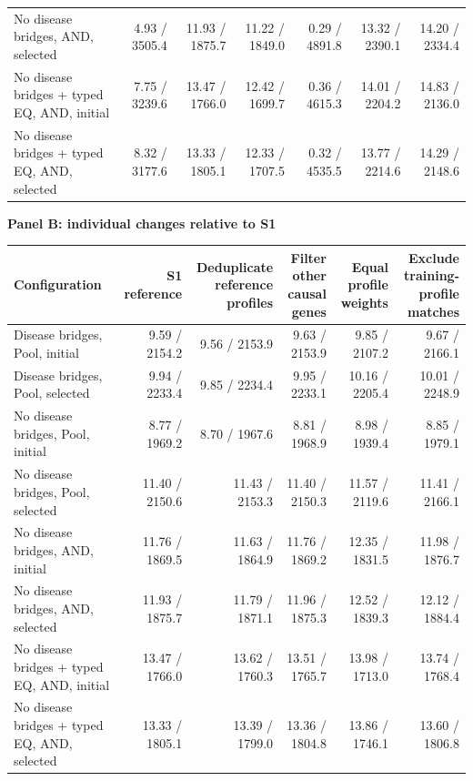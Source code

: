 \begin{landscape}
\begin{table}[p]
\begin{adjustbox}{max width=\linewidth}
\begin{tabular}{lrrrrrr}
No disease bridges, AND, selected & 4.93 / 3505.4 & 11.93 / 1875.7 & 11.22 / 1849.0 & 0.29 / 4891.8 & 13.32 / 2390.1 & 14.20 / 2334.4 \\
No disease bridges + typed EQ, AND, initial & 7.75 / 3239.6 & 13.47 / 1766.0 & 12.42 / 1699.7 & 0.36 / 4615.3 & 14.01 / 2204.2 & 14.83 / 2136.0 \\
No disease bridges + typed EQ, AND, selected & 8.32 / 3177.6 & 13.33 / 1805.1 & 12.33 / 1707.5 & 0.32 / 4535.5 & 13.77 / 2214.6 & 14.29 / 2148.6 \\
\bottomrule
\end{tabular}
\end{adjustbox}
\par\medskip
\textbf{Panel B: individual changes relative to S1}\par\smallskip
\begin{adjustbox}{max width=\linewidth}
\begin{tabular}{lrrrrr}
\toprule
Configuration & S1 reference & \shortstack{Deduplicate\\reference profiles} & \shortstack{Filter other\\causal genes} & \shortstack{Equal profile\\weights} & \shortstack{Exclude training-\\profile matches} \\
\midrule
Disease bridges, Pool, initial & 9.59 / 2154.2 & 9.56 / 2153.9 & 9.63 / 2153.9 & 9.85 / 2107.2 & 9.67 / 2166.1 \\
Disease bridges, Pool, selected & 9.94 / 2233.4 & 9.85 / 2234.4 & 9.95 / 2233.1 & 10.16 / 2205.4 & 10.01 / 2248.9 \\
No disease bridges, Pool, initial & 8.77 / 1969.2 & 8.70 / 1967.6 & 8.81 / 1968.9 & 8.98 / 1939.4 & 8.85 / 1979.1 \\
No disease bridges, Pool, selected & 11.40 / 2150.6 & 11.43 / 2153.3 & 11.40 / 2150.3 & 11.57 / 2119.6 & 11.41 / 2166.1 \\
No disease bridges, AND, initial & 11.76 / 1869.5 & 11.63 / 1864.9 & 11.76 / 1869.2 & 12.35 / 1831.5 & 11.98 / 1876.7 \\
No disease bridges, AND, selected & 11.93 / 1875.7 & 11.79 / 1871.1 & 11.96 / 1875.3 & 12.52 / 1839.3 & 12.12 / 1884.4 \\
No disease bridges + typed EQ, AND, initial & 13.47 / 1766.0 & 13.62 / 1760.3 & 13.51 / 1765.7 & 13.98 / 1713.0 & 13.74 / 1768.4 \\
No disease bridges + typed EQ, AND, selected & 13.33 / 1805.1 & 13.39 / 1799.0 & 13.36 / 1804.8 & 13.86 / 1746.1 & 13.60 / 1806.8 \\
\bottomrule
\end{tabular}
\end{adjustbox}
\end{table}
\clearpage
\end{landscape}
